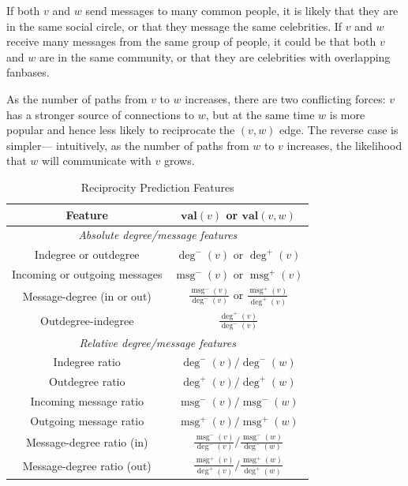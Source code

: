 \documentclass[conference]{IEEEtran}
\begin{document}
If both $v$ and $w$ send messages to many common people, it is likely that they are in the same social circle, or that they message the same celebrities. 
If $v$ and $w$ receive many messages from the same group of people, it could be that both $v$ and $w$ are in the same community, or that they are celebrities with overlapping fanbases.

As the number of paths from $v$ to $w$ increases, there are two conflicting forces: $v$ has a stronger source of connections to $w$, but at the same time
$w$ is more popular and hence less likely to reciprocate the $(v,w)$ edge.
The reverse case is simpler--- intuitively, as the number of paths from $w$ to $v$ increases, the likelihood that $w$ will communicate with $v$ grows.

\begin{table}[!t]
\renewcommand{\arraystretch}{1.3}
\caption{Reciprocity Prediction Features}
\label{table_recmethods}
\centering
\begin{tabular}{|c||c|}
\hline
\bf{Feature} & $\mathbf{val}(v)$ or $\mathbf{val}(v,w)$\\
\hline
\multicolumn{2}{|c|}{\emph{Absolute degree/message features}} \\
\hline
Indegree or outdegree & $\deg^-(v)$ or $\deg^+(v)$ \\
Incoming or outgoing messages & $\operatorname{msg}^-(v)$ or $\operatorname{msg}^+(v)$ \\
Message-degree (in or out) & $\frac{\operatorname{msg}^-(v)}{\deg^-(v)}$ or $\frac{\operatorname{msg}^+(v)}{\deg^+(v)}$ \\
Outdegree-indegree & $\frac{\deg^+(v)}{\deg^-(v)}$ \\
\hline
\multicolumn{2}{|c|}{\emph{Relative degree/message features}} \\
\hline
Indegree ratio & $\deg^-(v) / \deg^-(w)$ \\
Outdegree ratio & $\deg^+(v) / \deg^+(w)$ \\
\hline
Incoming message ratio & $\operatorname{msg}^-(v) / \operatorname{msg}^-(w)$ \\
Outgoing message ratio & $\operatorname{msg}^+(v) / \operatorname{msg}^+(w)$ \\
\hline
Message-degree ratio (in) & $\frac{\operatorname{msg}^-(v)}{\deg^-(v)} / \frac{\operatorname{msg}^-(w)}{\deg^-(w)}$ \\
Message-degree ratio (out) & $\frac{\operatorname{msg}^+(v)}{\deg^+(v)} / \frac{\operatorname{msg}^+(w)}{\deg^+(w)}$ \\

\end{tabular}
\end{table}
\end{document}
